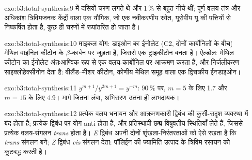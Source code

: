 \begin{solution}{exo:b3:total-synthesis:9}
 में दसियों चरण लगते थे और  1\,\% से बहुत नीचे थीं; पूर्ण
वलय-तंत्र और अधिकांश त्रिविमजनक केंद्रों वाला एक यौगिक, जो एक नवीकरणीय स्रोत, यूरोपीय यू
की पत्तियों से निष्कर्षित होता है, कुछ ही चरणों में रूपांतरित हो जाता है।
\end{solution}

\begin{solution}{exo:b3:total-synthesis:10}
माइकल योग: डाइओन का ईनोलेट (C2, दोनों कार्बोनिलों के बीच) मेथिल वाइनिल कीटोन के
$\beta$-कार्बन पर जुड़ता है, जिससे एक ट्राइकीटोन बनता है। ऐल्डोल: मेथिल कीटोन का
ईनोलेट अंतःआण्विक रूप से एक वलय-कार्बोनिल पर आक्रमण करता है, और निर्जलीकरण
साइक्लोहेक्सीनोन देता है: वीलैंड--मीशर कीटोन, कोणीय मेथिल समूह वाला
एक द्विचक्रीय ईनडाइओन।
\end{solution}

\begin{solution}{exo:b3:total-synthesis:11}
$y^{m+1}/y^{2m+1} = y^{-m}$: 90\,\% पर, $m = 5$ के लिए 1.7 और $m = 15$ के लिए 4.9। मार्ग जितना लंबा, अभिसरण
उतना ही लाभदायक।
\end{solution}

\begin{solution}{exo:b3:total-synthesis:12}
प्रत्येक वलय धनायन और आक्रमणकारी द्विबंध की कुर्सी-सदृश व्यवस्था में
बंद होता है; प्रत्येक द्विबंध पर योग anti होता है, और प्रतिस्थापी
छद्म-विषुवतीय स्थितियाँ लेते हैं, जिससे प्रत्येक वलय-संगलन \textit{trans} होता है। \textit{E} द्विबंध
अपनी दोनों शृंखला-निरंतरताओं को ऐसे रखता है कि \textit{trans} संगलन बने; \textit{Z} द्विबंध
\textit{cis} संगलन देता: पॉलिईन की ज्यामिति उत्पाद के त्रिविम रसायन को कूटबद्ध करती है।
\end{solution}

